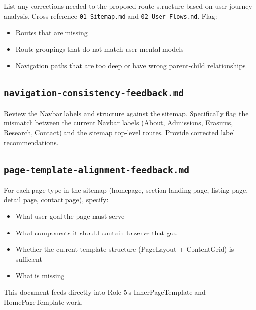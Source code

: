 \documentclass[12pt,a4paper]{article}
\begin{document}
List any corrections needed to the proposed route structure based on user journey analysis.
Cross-reference \texttt{01\_Sitemap.md} and \texttt{02\_User\_Flows.md}. Flag:

\begin{itemize}
    \item Routes that are missing
    \item Route groupings that do not match user mental models
    \item Navigation paths that are too deep or have wrong parent-child relationships
\end{itemize}

\subsection{\texttt{navigation-consistency-feedback.md}}

Review the Navbar labels and structure against the sitemap. Specifically flag the mismatch
between the current Navbar labels (About, Admissions, Erasmus, Research, Contact) and the
sitemap top-level routes. Provide corrected label recommendations.

\subsection{\texttt{page-template-alignment-feedback.md}}

For each page type in the sitemap (homepage, section landing page, listing page, detail
page, contact page), specify:

\begin{itemize}
    \item What user goal the page must serve
    \item What components it should contain to serve that goal
    \item Whether the current template structure (PageLayout + ContentGrid) is sufficient
    \item What is missing
\end{itemize}

This document feeds directly into Role 5's InnerPageTemplate and HomePageTemplate work.

\end{document}

